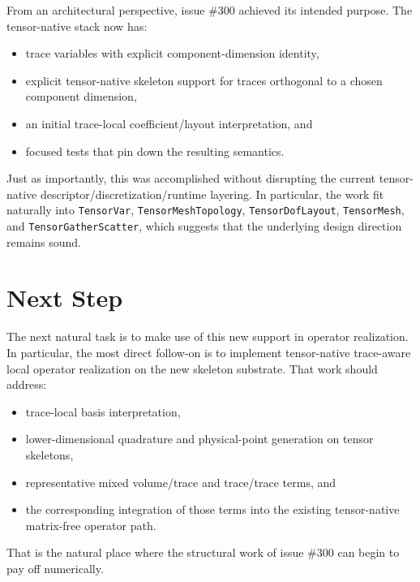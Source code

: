 \documentclass[11pt]{article}
\begin{document}
From an architectural perspective, issue \#300 achieved its intended purpose. The tensor-native stack now has:
\begin{itemize}[leftmargin=2em]
  \item trace variables with explicit component-dimension identity,
  \item explicit tensor-native skeleton support for traces orthogonal to a chosen component dimension,
  \item an initial trace-local coefficient/layout interpretation, and
  \item focused tests that pin down the resulting semantics.
\end{itemize}

Just as importantly, this was accomplished without disrupting the current tensor-native descriptor/discretization/runtime layering. In particular, the work fit naturally into \texttt{TensorVar}, \texttt{TensorMeshTopology}, \texttt{TensorDofLayout}, \texttt{TensorMesh}, and \texttt{TensorGatherScatter}, which suggests that the underlying design direction remains sound.

\section{Next Step}

The next natural task is to make use of this new support in operator realization. In particular, the most direct follow-on is to implement tensor-native trace-aware local operator realization on the new skeleton substrate. That work should address:
\begin{itemize}[leftmargin=2em]
  \item trace-local basis interpretation,
  \item lower-dimensional quadrature and physical-point generation on tensor skeletons,
  \item representative mixed volume/trace and trace/trace terms, and
  \item the corresponding integration of those terms into the existing tensor-native matrix-free operator path.
\end{itemize}

That is the natural place where the structural work of issue \#300 can begin to pay off numerically.
\end{document}
